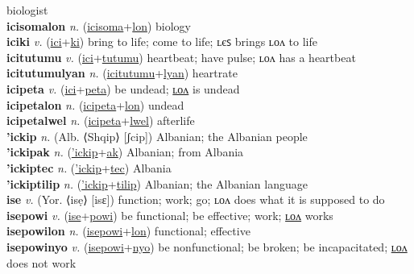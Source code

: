 biologist \label{icisomales} \\
\textbf{icisomalon} \textit{n.} (\hyperref[icisoma]{icisoma}+\hyperref[lon]{lon})
biology \label{icisomalon} \\
\textbf{iciki} \textit{v.} (\hyperref[ici]{ici}+\hyperref[ki]{ki})
bring to life; come to life; ʟєꜱ brings ʟᴏᴧ to life \label{iciki} \\
\textbf{icitutumu} \textit{v.} (\hyperref[ici]{ici}+\hyperref[tutumu]{tutumu})
heartbeat; have pulse; ʟᴏᴧ has a heartbeat \label{icitutumu} \\
\textbf{icitutumulyan} \textit{n.} (\hyperref[icitutumu]{icitutumu}+\hyperref[lyan]{lyan})
heartrate \label{icitutumulyan} \\
\textbf{icipeta} \textit{v.} (\hyperref[ici]{ici}+\hyperref[peta]{peta})
be undead; \hyperref[icipetalon]{ʟᴏᴧ} is undead \label{icipeta} \\
\textbf{icipetalon} \textit{n.} (\hyperref[icipeta]{icipeta}+\hyperref[lon]{lon})
undead \label{icipetalon} \\
\textbf{icipetalwel} \textit{n.} (\hyperref[icipeta]{icipeta}+\hyperref[lwel]{lwel})
afterlife \label{icipetalwel} \\
\textbf{'ickip} \textit{n.} (Alb. ⟨Shqip⟩ [ʃcip])
Albanian; the Albanian people \label{'ickip} \\
\textbf{'ickipak} \textit{n.} (\hyperref['ickip]{'ickip}+\hyperref[ak]{ak})
Albanian; from Albania \label{'ickipak} \\
\textbf{'ickiptec} \textit{n.} (\hyperref['ickip]{'ickip}+\hyperref[tec]{tec})
Albania \label{'ickiptec} \\
\textbf{'ickiptilip} \textit{n.} (\hyperref['ickip]{'ickip}+\hyperref[tilip]{tilip})
Albanian; the Albanian language \label{'ickiptilip} \\
\textbf{ise} \textit{v.} (Yor. ⟨isẹ⟩ [isɛ])
function; work; go; ʟᴏᴧ does what it is supposed to do \label{ise} \\
\textbf{isepowi} \textit{v.} (\hyperref[ise]{ise}+\hyperref[powi]{powi})
be functional; be effective; work; \hyperref[isepowilon]{ʟᴏᴧ} works \label{isepowi} \\
\textbf{isepowilon} \textit{n.} (\hyperref[isepowi]{isepowi}+\hyperref[lon]{lon})
functional; effective \label{isepowilon} \\
\textbf{isepowinyo} \textit{v.} (\hyperref[isepowi]{isepowi}+\hyperref[nyo]{nyo})
be nonfunctional; be broken; be incapacitated; \hyperref[isepowinyolon]{ʟᴏᴧ} does not work \label{isepowinyo} \\
